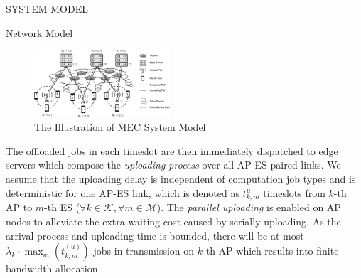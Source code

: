 \documentclass[10pt, conference, letterpaper]{IEEEtran}
\newcommand{\apSet}{\mathcal{K}}
\newcommand{\esSet}{\mathcal{M}}
\begin{document}
\begin{section}{SYSTEM MODEL}
\begin{subsection}{Network Model}
            \begin{figure}[ht]
                \centering
                \includegraphics[width=0.45\textwidth, trim={0.5cm 0.5cm 0.5cm 0.5cm}, clip]{system-model.pdf}
                \caption{The Illustration of MEC System Model}
                \label{fig:system}
            \end{figure}

            The offloaded jobs in each timeslot are then immediately dispatched to edge servers which compose the \emph{uploading process} over all AP-ES paired links. We assume that the uploading delay is independent of computation job types and is deterministic for one AP-ES link, which is denoted as $t^{u}_{k,m}$ timeslots from $k$-th AP to $m$-th ES ($\forall k\in\apSet, \forall m\in\esSet$).
            The \emph{parallel uploading} is enabled on AP nodes to alleviate the extra waiting cost caused by serially uploading. As the arrival process and uploading time is bounded, there will be at most $\lambda_k \cdot \max_m(t^{(u)}_{k,m})$ jobs in transmission on $k$-th AP which results into finite bandwidth allocation.
        \end{subsection}


\end{section}
\end{document}
